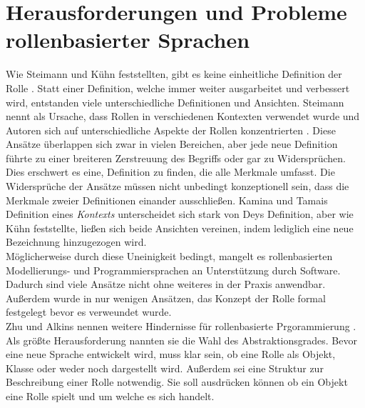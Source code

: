 \documentclass[conference]{IEEEtran}
\begin{document}
\section{Herausforderungen und Probleme rollenbasierter Sprachen} Wie Steimann und Kühn feststellten, gibt es keine einheitliche Definition der Rolle \cite{family}\cite{steimann2000representation}. Statt einer Definition, welche immer weiter ausgarbeitet und verbessert wird, entstanden viele unterschiedliche Definitionen und Ansichten. Steimann nennt als Ursache, dass Rollen in verschiedenen Kontexten verwendet wurde und Autoren sich auf unterschiedliche Aspekte der Rollen konzentrierten \cite{steimann2000representation}. Diese Ansätze überlappen sich zwar in vielen Bereichen, aber jede neue Definition führte zu einer breiteren Zerstreuung des Begriffs oder gar zu Widersprüchen. Dies erschwert es eine, Definition zu finden, die alle Merkmale umfasst. Die Widersprüche der Ansätze müssen nicht unbedingt konzeptionell sein, dass die Merkmale zweier Definitionen einander ausschließen. Kamina und Tamais Definition\cite{kamina2005selective} eines \textit{Kontexts} unterscheidet sich stark von Deys Definition\cite{dey2001understanding}, aber wie Kühn feststellte, ließen sich beide Ansichten vereinen, indem lediglich eine neue Bezeichnung hinzugezogen wird.  \\ Möglicherweise durch diese Uneinigkeit bedingt, mangelt es rollenbasierten Modellierungs- und Programmiersprachen an Unterstützung durch Software. Dadurch sind viele Ansätze nicht ohne weiteres in der Praxis anwendbar. Außerdem wurde in nur wenigen Ansätzen, das Konzept der Rolle formal festgelegt bevor es verweundet wurde.\\ Zhu und Alkins nennen weitere Hindernisse für rollenbasierte Prgorammierung \cite{zhu2006towards}. Als größte Herausforderung nannten sie die Wahl des Abstraktionsgrades. Bevor eine neue Sprache entwickelt wird, muss klar sein, ob eine Rolle als Objekt, Klasse oder weder noch dargestellt wird. Außerdem sei eine Struktur zur Beschreibung einer Rolle notwendig. Sie soll ausdrücken können ob ein Objekt eine Rolle spielt und um welche es sich handelt. \\
\end{document}
